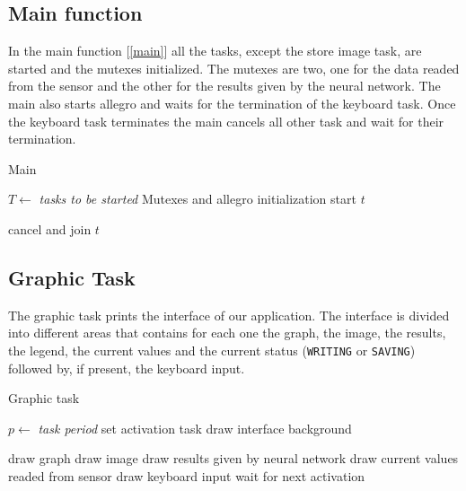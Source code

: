 \documentclass[12pt]{article}
\begin{document}
\subsection{Main function}
In the main function [\ref{main}] all the tasks, except the store image task,
are started and the mutexes initialized. The mutexes are two, one for the
data readed from the sensor and the other for the results given by the neural
network. The main also starts allegro and waits for the termination of the
keyboard task. Once the keyboard task terminates the main cancels all other
task and wait for their termination.

\begin{algorithm}[t]
\caption{Main}
\label{main}

\begin{algorithmic}
\State $T\gets$ \textit{tasks to be started}
\State Mutexes and allegro initialization
    \State start $t$
\EndFor

\EndLoop

    \State cancel and join $t$
\EndFor

\end{algorithmic}
\end{algorithm}

\subsection{Graphic Task}

The graphic task prints the interface of our application. The
interface is divided into different areas that contains for each one the
graph, the image, the results, the legend, the current values and the current
status (\texttt{WRITING} or \texttt{SAVING}) followed by, if present, the
keyboard input.

\begin{algorithm}[t]
\caption{Graphic task}
\label{graphic}
\begin{algorithmic}
\State $p\gets$ \textit{task period}
\State set activation task
\State draw interface background

\Loop
\State draw graph
\State draw image
\State draw results given by neural network
\State draw current values readed from sensor
\State draw keyboard input
\State wait for next activation
\EndLoop

\end{algorithmic}
\end{algorithm}
\end{document}
